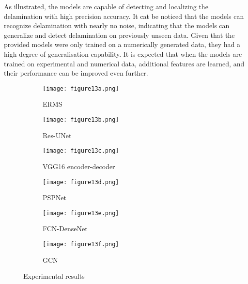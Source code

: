 As illustrated, the models are capable of detecting and localizing the delamination with high precision accuracy.
It cat be noticed that the models can recognize delamination with nearly no noise, indicating that the models can generalize and detect delamination on previously unseen data.
Given that the provided models were only trained on a numerically generated data, they had a high degree of generalisation capability.
It is expected that when the models are trained on experimental and numerical data, additional features are learned, and their performance can be improved even further.
\begin{figure}[h!]
	\centering
	\begin{subfigure}[b]{0.47\textwidth}
		\centering
		\texttt{[image: figure13a.png]}
		\caption{ERMS} %
		\label{fig:Delamination}	
	\end{subfigure}	
	\hfill
	\begin{subfigure}[b]{0.47\textwidth}
		\centering
		\texttt{[image: figure13b.png]}
		\caption{Res-UNet} 
		\label{fig:unet_exp_7_}
	\end{subfigure}
	\hfill
	\begin{subfigure}[b]{0.47\textwidth}
		\centering
		\texttt{[image: figure13c.png]}
		\caption{VGG16 encoder-decoder} 
		\label{fig:vgg16_exp_7_}
	\end{subfigure}
	\hfill
	\begin{subfigure}[b]{0.47\textwidth}
		\centering
		\texttt{[image: figure13d.png]}
		\caption{PSPNet} 
		\label{fig:pspnet_exp_7_}
	\end{subfigure}
	\hfill
	\begin{subfigure}[b]{0.47\textwidth}
		\centering
		\texttt{[image: figure13e.png]}
		\caption{FCN-DenseNet} 
		\label{fig:fcn_densenet_exp}
	\end{subfigure}
	\hfill
	\begin{subfigure}[b]{0.47\textwidth}
		\centering
		\texttt{[image: figure13f.png]}
		\caption{GCN} 
		\label{fig:gcn_exp}
	\end{subfigure}
	\caption{Experimental results}
	\label{fig:Exp_ERMS_teflon}
\end{figure}
\clearpage
